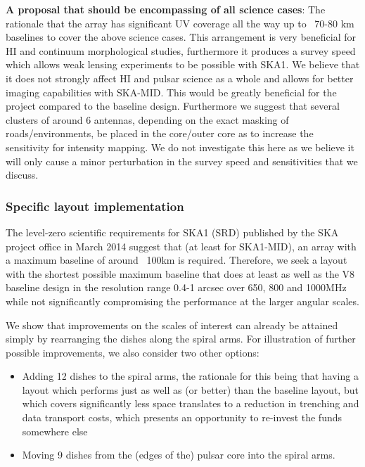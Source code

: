 \documentclass[sfheadings,a4paper,times,9pt,floats,floatfix]{article}
\begin{document}
{\bf A proposal that should be encompassing of all science cases}: The rationale that the array
has significant UV coverage all the way up to ~70-80 km baselines to cover the above
science cases. This arrangement is very beneficial for HI and continuum morphological studies,
furthermore it produces a survey speed which allows weak lensing experiments to be
possible with SKA1. We believe that it does not strongly affect HI and pulsar science as a whole and allows for
better imaging capabilities with SKA-MID. This would be greatly beneficial for the project
compared to the baseline design. Furthermore we suggest that several clusters of around 6
antennas, depending on the exact masking of roads/environments, be placed in the core/outer
core as to increase the sensitivity for intensity mapping. We do not
investigate this here as we believe it will only cause a minor perturbation in
the survey speed and sensitivities that we discuss.

\subsubsection{Specific layout implementation}
The level-zero scientific requirements for SKA1 (SRD) \cite{srd} published by the SKA project office in March 2014
suggest that (at least for SKA1-MID), an array with a maximum baseline of around ~100km is required. Therefore, we seek
a layout with the shortest possible maximum baseline that does at least as well as the V8 baseline design in the
resolution range 0.4-1 arcsec over 650, 800 and 1000MHz while not significantly compromising the performance at the
larger angular scales. 

We show that improvements on the scales of interest can already be attained simply by rearranging the dishes along 
the spiral arms. For illustration of further possible improvements, we also consider two other options: 

\begin{itemize}
\item Adding 12 dishes to the spiral arms, the rationale for this 
being that having a layout which performs just as well as (or better) than the baseline layout, but which 
covers significantly less space translates to a reduction in trenching and data transport
costs, which presents an opportunity to re-invest the funds somewhere else

\item Moving 9 dishes from the (edges of the) pulsar core into the spiral arms. 
\end{itemize}
\end{document}
